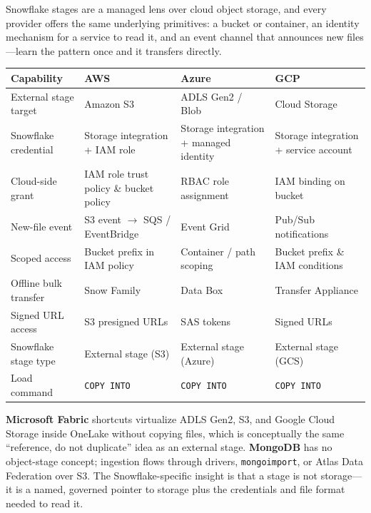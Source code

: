 \begin{crosscloud}
Snowflake stages are a managed lens over cloud object storage, and every provider offers the same underlying primitives: a bucket or container, an identity mechanism for a service to read it, and an event channel that announces new files---learn the pattern once and it transfers directly.

\vspace{2mm}
{\footnotesize
\begin{tabular}{@{}p{2.8cm}p{3.0cm}p{3.0cm}p{3.0cm}@{}}
\toprule
\textbf{Capability} & \textbf{AWS} & \textbf{Azure} & \textbf{GCP} \\
\midrule
External stage target & Amazon S3 & ADLS Gen2 / Blob & Cloud Storage \\
Snowflake credential & Storage integration + IAM role & Storage integration + managed identity & Storage integration + service account \\
Cloud-side grant & IAM role trust policy \& bucket policy & RBAC role assignment & IAM binding on bucket \\
New-file event & S3 event $\rightarrow$ SQS / EventBridge & Event Grid & Pub/Sub notifications \\
Scoped access & Bucket prefix in IAM policy & Container / path scoping & Bucket prefix \& IAM conditions \\
Offline bulk transfer & Snow Family & Data Box & Transfer Appliance \\
Signed URL access & S3 presigned URLs & SAS tokens & Signed URLs \\
\addlinespace
Snowflake stage type & External stage (S3) & External stage (Azure) & External stage (GCS) \\
Load command & \texttt{COPY INTO} & \texttt{COPY INTO} & \texttt{COPY INTO} \\
\bottomrule
\end{tabular}}

\vspace{1mm}
\textbf{Microsoft Fabric} shortcuts virtualize ADLS Gen2, S3, and Google Cloud Storage inside OneLake without copying files, which is conceptually the same ``reference, do not duplicate'' idea as an external stage. \textbf{MongoDB} has no object-stage concept; ingestion flows through drivers, \texttt{mongoimport}, or Atlas Data Federation over S3. The Snowflake-specific insight is that a stage is not storage---it is a named, governed pointer to storage plus the credentials and file format needed to read it.
\end{crosscloud}

